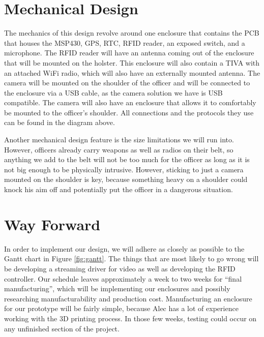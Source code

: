 \documentclass[12pt]{article}
\begin{document}
\section{Mechanical Design}

The mechanics of this design revolve around one enclosure that contains the PCB
that houses the MSP430, GPS, RTC, RFID reader, an exposed switch, and a
microphone. The RFID reader will have an antenna coming out of the enclosure
that will be mounted on the holster. This enclosure will also contain a TIVA
with an attached WiFi radio, which will also have an externally mounted
antenna. The camera will be mounted on the shoulder of the officer and will be
connected to the enclosure via a USB cable, as the camera solution we have is
USB compatible. The camera will also have an enclosure that allows it to
comfortably be mounted to the officer's shoulder. All connections and the
protocols they use can be found in the diagram above.

Another mechanical design feature is the size limitations we will run into.
However, officers already carry weapons as well as radios on their belt, so
anything we add to the belt will not be too much for the officer as long as it
is not big enough to be physically intrusive. However, sticking to just a
camera mounted on the shoulder is key, because something heavy on a shoulder
could knock his aim off and potentially put the officer in a dangerous
situation. 

\section{Way Forward}

In order to implement our design, we will adhere as closely as possible to the
Gantt chart in Figure \ref{fig:gantt}. The things that are most likely to go
wrong will be developing a streaming driver for video as well as developing the
RFID controller. Our schedule leaves approximately a week to two weeks for
``final manufacturing'', which will be implementing our enclosures and possibly
researching manufacturability and production cost. Manufacturing an enclosure
for our prototype will be fairly simple, because Alec has a lot of experience
working with the 3D printing process. In those few weeks, testing could occur
on any unfinished section of the project. 
\end{document}
